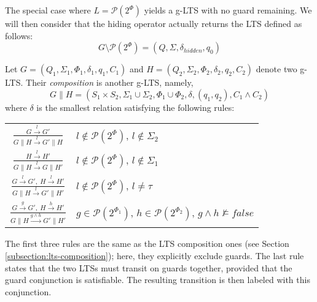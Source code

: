 The special case where $L = \mathcal{P}(2^\Phi)$ yields a g-LTS with no guard remaining. We will then consider that the hiding operator actually returns the LTS defined as follows:
\begin{equation*}
G \setminus \mathcal{P}(2^\Phi) = (Q,\Sigma,\delta_{hidden},q_0)
\end{equation*}

\begin{definition}
Let $G = (Q_1,\Sigma_1,\Phi_1,\delta_1,q_{1},C_{1})$ and $H = (Q_2,\Sigma_2,\Phi_2,\delta_2,q_{2},C_{2})$ denote two g-LTS. Their \emph{composition} is another g-LTS, namely,
\begin{equation*}
G \parallel H = (S_1 \times S_2,\Sigma_1\cup\Sigma_2,\Phi_1\cup\Phi_2,\delta,(q_1,q_2),C_1 \wedge C_2)
\end{equation*}
\noindent where $\delta$ is the smallest relation satisfying the following rules:

\centering
\begin{tabular}{cl}
$\frac{\displaystyle G \stackrel{l}{\longrightarrow} G'}{\displaystyle G \parallel H \stackrel{l}{\longrightarrow} G' \parallel H}$ & $l \notin \mathcal{P}(2^\Phi)$, $l \notin \Sigma_2$ \\[20pt]

$\frac{\displaystyle H \stackrel{l}{\longrightarrow} H'}{\displaystyle G \parallel H \stackrel{l}{\longrightarrow} G \parallel H'}$ & $l \notin \mathcal{P}(2^\Phi)$, $l \notin \Sigma_1$ \\[20pt]

$\frac{\displaystyle G \stackrel{l}{\longrightarrow} G',~H \stackrel{l}{\longrightarrow} H'}{\displaystyle G \parallel H \stackrel{l}{\longrightarrow} G' \parallel H'}$ & $l \notin \mathcal{P}(2^\Phi)$, $l \neq \tau$ \\[20pt]

$\frac{\displaystyle G \stackrel{g}{\longrightarrow} G',~H \stackrel{h}{\longrightarrow} H'}{\displaystyle G \parallel H \stackrel{g \wedge h}{\longrightarrow} G' \parallel H'}$ & $g \in \mathcal{P}(2^{\Phi_1})$, $h \in \mathcal{P}(2^{\Phi_2})$, $g \wedge h \nvDash false$ 
\end{tabular}
\label{definition:glts-composition}
\end{definition}

The first three rules are the same as the LTS composition ones (see Section \ref{subsection:lts-composition}); here, they explicitly exclude guards. The last rule states that the two LTSs must transit on guards together, provided that the guard conjunction is satisfiable. The resulting transition is then labeled with this conjunction.
